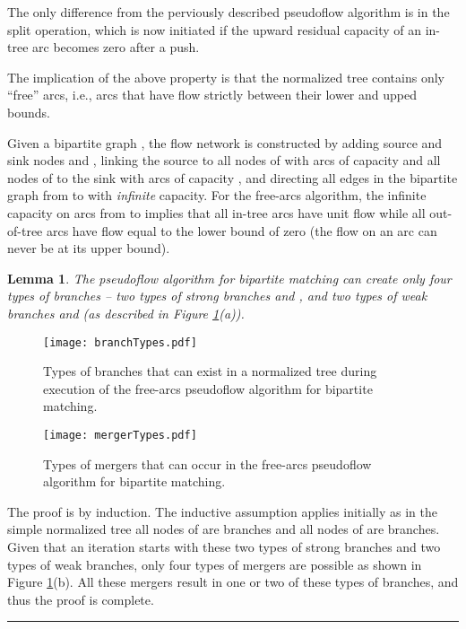 \documentclass{article}
\newtheorem{lemma}{Lemma}[section]
\newenvironment{proof}[1][Proof:]{\begin{trivlist}
\item[\hskip \labelsep {\bfseries #1}]}{\end{trivlist}}
\newcommand{\qed}{\hfill \rule{2.5mm}{2.5mm}}
\begin{document}
The only difference from the perviously described pseudoflow algorithm is in the {\sf split} operation, which is now initiated if the upward residual capacity of an in-tree arc becomes zero after a push.

The implication of the above property is that the normalized tree contains only ``free'' arcs, i.e., arcs that have flow strictly between their lower and upped bounds.

Given a bipartite graph , the flow network is constructed by adding source and sink nodes  and , linking the source to all nodes of  with arcs of capacity  and all nodes of  to the sink with arcs of capacity , and directing all edges in the bipartite graph from  to  with {\em infinite} capacity.  For the free-arcs algorithm, the infinite capacity on arcs from  to  implies that all in-tree arcs have unit flow while all out-of-tree arcs have flow equal to the lower bound of zero (the flow on an arc can never be at its upper bound).

\begin{lemma}
\label{lem:branchtypes} The pseudoflow algorithm for bipartite matching can create only four types of branches -- two types of strong branches  and , and two types of weak branches  and  (as described in Figure \ref{fig:branchtypes}(a)).
\end{lemma}

\begin{figure}[ht]
\centerline{\texttt{[image: branchTypes.pdf]}}
\caption{\label{fig:branchtypes}Types of branches that can exist in a normalized tree during execution of the free-arcs pseudoflow algorithm for bipartite matching.}
\end{figure}

\begin{figure}[ht]
\centerline{\texttt{[image: mergerTypes.pdf]}}
\caption{\label{fig:mergertypes}Types of mergers that can occur in the free-arcs pseudoflow algorithm for bipartite matching.}
\end{figure}

\begin{proof}
The proof is by induction.  The inductive assumption applies initially as in the simple normalized tree all nodes of  are  branches and all nodes of  are  branches.  Given that an iteration starts with these two types of strong branches and two types of weak branches, only four types of mergers are possible as shown in Figure \ref{fig:branchtypes}(b).  All these mergers result in one or two of these types of branches, and thus the proof is complete. \qed
\end{proof}
\end{document}
